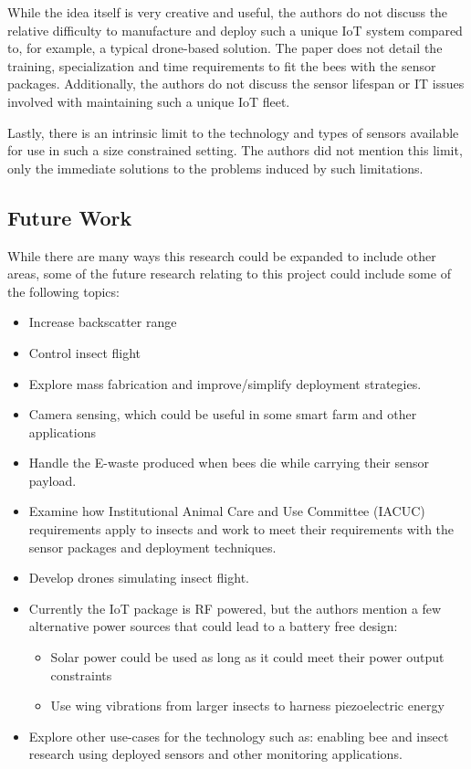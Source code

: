 \documentclass[letterpaper,twocolumn,10pt]{article}
\begin{document}
While the idea itself is very creative and useful, the authors do not discuss the relative difficulty to manufacture and deploy such a unique IoT system compared to, for example, a typical drone-based solution. The paper does not detail the training, specialization and time requirements to fit the bees with the sensor packages. Additionally, the authors do not discuss the sensor lifespan or IT issues involved with maintaining such a unique IoT fleet.

Lastly, there is an intrinsic limit to the technology and types of sensors available for use in such a size constrained setting. The authors did not mention this limit, only the immediate solutions to the problems induced by such limitations.

\subsection*{Future Work}

While there are many ways this research could be expanded to include other areas, some of the future research relating to this project could include some of the following topics: 

\begin{itemize}
    \item Increase backscatter range
    \item Control insect flight
    \item Explore mass fabrication and improve/simplify deployment strategies.
    \item Camera sensing, which could be useful in some smart farm and other applications
    \item Handle the E-waste produced when bees die while carrying their sensor payload.
    \item Examine how Institutional Animal Care and Use Committee (IACUC) requirements apply to insects and work to meet their requirements with the sensor packages and deployment techniques.
    \item Develop drones simulating insect flight.
    \item Currently the IoT package is RF powered, but the authors mention a few alternative power sources that could lead to a battery free design:
    \begin{itemize}
        \item Solar power could be used as long as it could meet their power output constraints
        \item Use wing vibrations from larger insects to harness piezoelectric energy
    \end{itemize}
    \item Explore other use-cases for the technology such as: enabling bee and insect research using deployed sensors and other monitoring applications.
\end{itemize}
\end{document}
